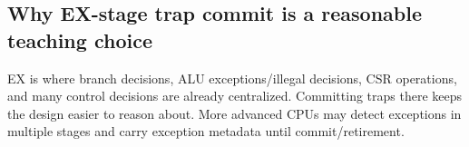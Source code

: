 \subsection{Why EX-stage trap commit is a reasonable teaching choice}

EX is where branch decisions, ALU exceptions/illegal decisions, CSR operations, and many control decisions are already centralized. Committing traps there keeps the design easier to reason about. More advanced CPUs may detect exceptions in multiple stages and carry exception metadata until commit/retirement.

\bigskip
